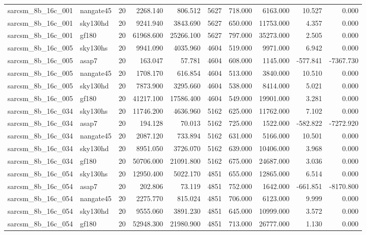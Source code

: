 \documentclass{article}
\begin{document}
\begin{longtable}{llrrrrrrrr}
sarcsm\_8b\_16c\_001 & nangate45 & 20 & 2268.140 & 806.512 & 5627 & 718.000 & 6163.000 & 10.527 & 0.000 \\
sarcsm\_8b\_16c\_001 & sky130hd & 20 & 9241.940 & 3843.690 & 5627 & 650.000 & 11753.000 & 4.357 & 0.000 \\
sarcsm\_8b\_16c\_001 & gf180 & 20 & 61968.600 & 25266.100 & 5627 & 797.000 & 35273.000 & 2.505 & 0.000 \\
sarcsm\_8b\_16c\_005 & sky130hs & 20 & 9941.090 & 4035.960 & 4604 & 519.000 & 9971.000 & 6.942 & 0.000 \\
sarcsm\_8b\_16c\_005 & asap7 & 20 & 163.047 & 57.781 & 4604 & 608.000 & 1145.000 & -577.841 & -7367.730 \\
sarcsm\_8b\_16c\_005 & nangate45 & 20 & 1708.170 & 616.854 & 4604 & 513.000 & 3840.000 & 10.510 & 0.000 \\
sarcsm\_8b\_16c\_005 & sky130hd & 20 & 7873.900 & 3295.660 & 4604 & 538.000 & 8414.000 & 5.021 & 0.000 \\
sarcsm\_8b\_16c\_005 & gf180 & 20 & 41217.100 & 17586.400 & 4604 & 549.000 & 19901.000 & 3.281 & 0.000 \\
sarcsm\_8b\_16c\_034 & sky130hs & 20 & 11746.200 & 4636.960 & 5162 & 625.000 & 11762.000 & 7.102 & 0.000 \\
sarcsm\_8b\_16c\_034 & asap7 & 20 & 194.128 & 70.013 & 5162 & 725.000 & 1522.000 & -582.822 & -7272.920 \\
sarcsm\_8b\_16c\_034 & nangate45 & 20 & 2087.120 & 733.894 & 5162 & 631.000 & 5166.000 & 10.501 & 0.000 \\
sarcsm\_8b\_16c\_034 & sky130hd & 20 & 8951.050 & 3726.070 & 5162 & 639.000 & 10406.000 & 3.968 & 0.000 \\
sarcsm\_8b\_16c\_034 & gf180 & 20 & 50706.000 & 21091.800 & 5162 & 675.000 & 24687.000 & 3.036 & 0.000 \\
sarcsm\_8b\_16c\_054 & sky130hs & 20 & 12950.400 & 5022.170 & 4851 & 655.000 & 12865.000 & 6.514 & 0.000 \\
sarcsm\_8b\_16c\_054 & asap7 & 20 & 202.806 & 73.119 & 4851 & 752.000 & 1642.000 & -661.851 & -8170.800 \\
sarcsm\_8b\_16c\_054 & nangate45 & 20 & 2275.770 & 815.024 & 4851 & 706.000 & 6123.000 & 9.999 & 0.000 \\
sarcsm\_8b\_16c\_054 & sky130hd & 20 & 9555.060 & 3891.230 & 4851 & 645.000 & 10999.000 & 3.572 & 0.000 \\
sarcsm\_8b\_16c\_054 & gf180 & 20 & 52948.300 & 21980.900 & 4851 & 713.000 & 26777.000 & 1.130 & 0.000 \\

\end{longtable}
\end{document}
